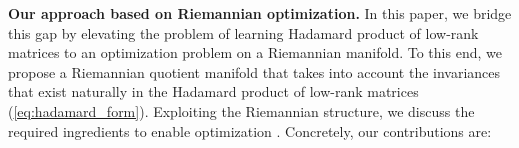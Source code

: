 \documentclass[letterpaper, 10 pt, conference]{ieeeconf}
\theoremstyle{plain}
\theoremstyle{definition}
\theoremstyle{remark}
\newcommand{\BMmod}[1]{{\color{blue}#1}}%
\begin{document}
\noindent \textbf{Our approach based on Riemannian optimization.}
In this paper, we bridge this gap by elevating the problem of learning Hadamard product of low-rank matrices to an optimization problem on a Riemannian manifold. To this end, we propose a Riemannian quotient manifold that takes into account the invariances that exist naturally in the Hadamard product of low-rank matrices (\ref{eq:hadamard_form}).
Exploiting the Riemannian structure, we discuss the required ingredients to enable optimization \citep{boumal2023introduction, absilbook}. 
Concretely, our contributions are:
\end{document}
